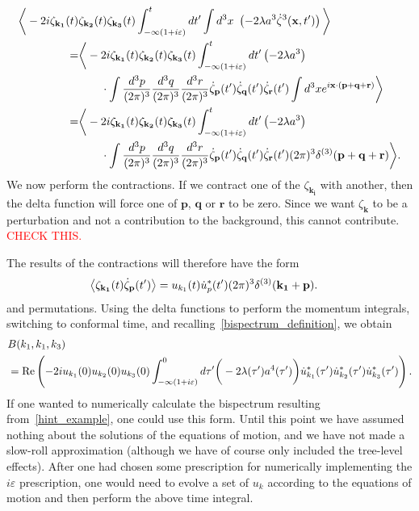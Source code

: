 \begin{align}\label{inin_example_2}
    \bigg<-2i \zeta_{\mathbf{k_1}}(t)&\zeta_{\mathbf{k_2}}(t)\zeta_{\mathbf{k_3}}(t)
    \int_{-\infty(1+i\varepsilon)}^{t}dt'
    \int d^3x~\left(-2\lambda a^3\dot{\zeta}^3(\mathbf{x},t')\right)
    \bigg>\\
    =&\bigg<-2i \zeta_{\mathbf{k_1}}(t)\zeta_{\mathbf{k_2}}(t)\zeta_{\mathbf{k_3}}(t)
    \int_{-\infty(1+i\varepsilon)}^{t}dt'\left(-2\lambda a^3\right)\nonumber\\
    &\qquad\cdot
    \int \frac{d^3p}{(2\pi)^3}
    \frac{d^3q}{(2\pi)^3}
    \frac{d^3r}{(2\pi)^3}
    \dot{\zeta}_{\mathbf{p}}(t')
    \dot{\zeta}_{\mathbf{q}}(t')
    \dot{\zeta}_{\mathbf{r}}(t')
    \int d^3x e^{i\mathbf{x}\cdot(\mathbf{p}+\mathbf{q}+\mathbf{r})}
    \bigg>\\
    =&\bigg<-2i \zeta_{\mathbf{k_1}}(t)\zeta_{\mathbf{k_2}}(t)\zeta_{\mathbf{k_3}}(t)
    \int_{-\infty(1+i\varepsilon)}^{t}dt'\left(-2\lambda a^3\right)\nonumber\\
    &\qquad\cdot
    \int \frac{d^3p}{(2\pi)^3}
    \frac{d^3q}{(2\pi)^3}
    \frac{d^3r}{(2\pi)^3}
    \dot{\zeta}_{\mathbf{p}}(t')
    \dot{\zeta}_{\mathbf{q}}(t')
    \dot{\zeta}_{\mathbf{r}}(t')
    (2\pi)^3\delta^{(3)}(\mathbf{p}+\mathbf{q}+\mathbf{r})
    \bigg>.
\end{align}
We now perform the contractions. If we contract one of the $\zeta_{\mathbf{k_i}}$ with
another, then the delta function will force one of $\mathbf{p}$, $\mathbf{q}$
or $\mathbf{r}$ to be zero. Since we want $\zeta_\mathbf{k}$ to be a perturbation
and not a contribution to the background, this cannot contribute.
\textcolor{red}{CHECK THIS.}

The results of the contractions will therefore have the form
\begin{align}
    \left<\zeta_{\mathbf{k_1}}(t)\dot{\zeta}_{\mathbf{p}}(t')\right>
    &= u_{k_1}(t)\dot{u}^*_{p}(t')(2\pi)^3\delta^{(3)}(\mathbf{k_1}+\mathbf{p}).
\end{align}
and permutations.
Using the delta functions to perform the momentum integrals,
switching to conformal time,
and recalling~\eqref{bispectrum_definition}, we obtain
\begin{align}\label{inin_computer}
    &B(k_1, k_1, k_3)\nonumber\\
    &=
    \operatorname{Re}\left(-2i u_{k_1}(0)u_{k_2}(0)u_{k_3}(0)
    \int_{-\infty(1+i\varepsilon)}^{0}d\tau'\bigg(-2\lambda(\tau') a^4(\tau')\bigg)
    \dot{u}^*_{k_1}(\tau')
    \dot{u}^*_{k_2}(\tau')
    \dot{u}^*_{k_3}(\tau')
    \right).
\end{align}
If one wanted to numerically calculate the bispectrum resulting from~\eqref{hint_example},
one could use this form. Until this point we have assumed nothing about the solutions of the
equations of motion, and we have not made a slow-roll approximation (although we have
of course only included the tree-level effects).
After one had chosen some prescription for numerically implementing the
$i\varepsilon$ prescription, one would need to evolve a set of $u_{k}$
according to the equations of motion and then perform the above time integral.


